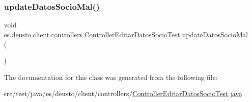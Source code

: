 \subsubsection{\texorpdfstring{updateDatosSocioMal()}{updateDatosSocioMal()}}
{\footnotesize\ttfamily void es.\+deusto.\+client.\+controllers.\+Controller\+Editar\+Datos\+Socio\+Test.\+update\+Datos\+Socio\+Mal (\begin{DoxyParamCaption}{ }\end{DoxyParamCaption})}



The documentation for this class was generated from the following file\+:\begin{DoxyCompactItemize}
\item 
src/test/java/es/deusto/client/controllers/\mbox{\hyperlink{_controller_editar_datos_socio_test_8java}{Controller\+Editar\+Datos\+Socio\+Test.\+java}}\end{DoxyCompactItemize}

